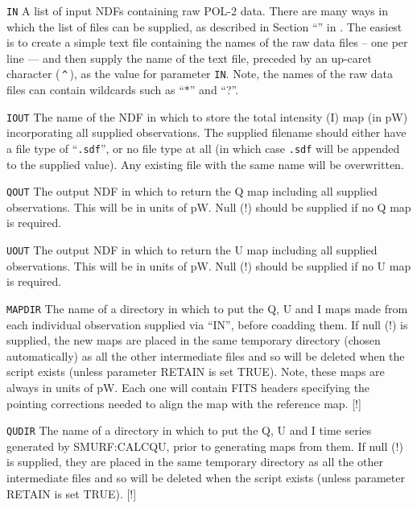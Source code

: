 \begin{aligndesc}
\item[\texttt{IN}] A list of input NDFs containing raw POL-2 data.
  There are many ways in which the list of files can be supplied, as
  described in Section ``'' in . The
  easiest is to create a simple text file containing the names of the
  raw data files -- one per line --- and then supply the name of the
  text file, preceded by an up-caret character (\,\texttt{\^{}}\,), as
  the value for parameter \texttt{IN}. Note, the names of the raw data
  files can contain wildcards such as ``$*$'' and ``?''.

\item[\texttt{IOUT}] The name of the NDF in which to store the
  total intensity (I) map (in pW) incorporating all supplied observations.
  The supplied filename should either have a file type of
  ``\texttt{.sdf}'', or no file type at all (in which case
  \texttt{.sdf} will be appended to the supplied value). Any existing
  file with the same name will be overwritten.

\item[\texttt{QOUT}] The output NDF in which to return the Q map
  including all supplied observations. This will be in units of
  pW. Null (!) should be supplied if no Q map is required.


\item[\texttt{UOUT}] The output NDF in which to return the U map
  including all supplied observations. This will be in units of
  pW. Null (!) should be supplied if no U map is required.

\item[\texttt{MAPDIR}] The name of a directory in which to put the Q,
  U and I maps made from each individual observation supplied via
  ``IN'', before coadding them. If null (!) is supplied, the new maps are
  placed in the same temporary directory (chosen automatically) as all the
  other intermediate files and so will be deleted when the script exists
  (unless parameter RETAIN is set TRUE). Note, these maps are always in
  units of pW. Each one will contain FITS headers specifying the pointing
  corrections needed to align the map with the reference map. [!]


\item[\texttt{QUDIR}] The name of a directory in which to put the Q, U
  and I time series generated by SMURF:CALCQU, prior to generating
  maps from them. If null (!) is supplied, they are placed in the same
  temporary directory as all the other intermediate files and so will
  be deleted when the script exists (unless parameter RETAIN is set
  TRUE). [!]
\end{aligndesc}

